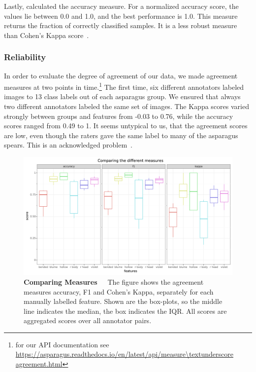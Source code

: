 \bigskip
Lastly, calculated the accuracy measure. For a normalized accuracy score, the values lie between 0.0 and 1.0, and the best performance is 1.0. This measure returns the fraction of correctly classified samples. It is a less robust measure than Cohen’s Kappa score~\citep{mchugh2012interrater}.


\subsubsection{Reliability}
\label{subsec:Reliability}

In order to evaluate the degree of agreement of our data, we made agreement measures at two points in time.\footnote{for our API documentation see \\ \url{https://asparagus.readthedocs.io/en/latest/api/measure\textunderscore agreement.html}} The first time, six different annotators labeled images to 13 class labels out of each asparagus group. We ensured that always two different annotators labeled the same set of images. The Kappa scores varied strongly between groups and features from -0.03 to 0.76, while the accuracy scores ranged from 0.49 to 1. It seems untypical to us, that the agreement scores are low, even though the raters gave the same label to many of the asparagus spears. This is an acknowledged problem~\citep{powers2012problem,sim2005kappa,feinstein1990high,posterFlight}.

\begin{figure}[!ht]
	\centering
	\includegraphics[scale=0.55]{Figures/chapter03/kappa_measurewise.png}
	\decoRule
	\caption[Agreement Measure-Wise Comparison of all Features]{\textbf{Comparing Measures}~~~The figure shows the agreement measures accuracy, F1 and Cohen’s Kappa, separately for each manually labelled feature. Shown are the box-plots, so the middle line indicates the median, the box indicates the IQR. All scores are aggregated scores over all annotator pairs.}
	\label{fig:KappaMeasurewise}
\end{figure}

